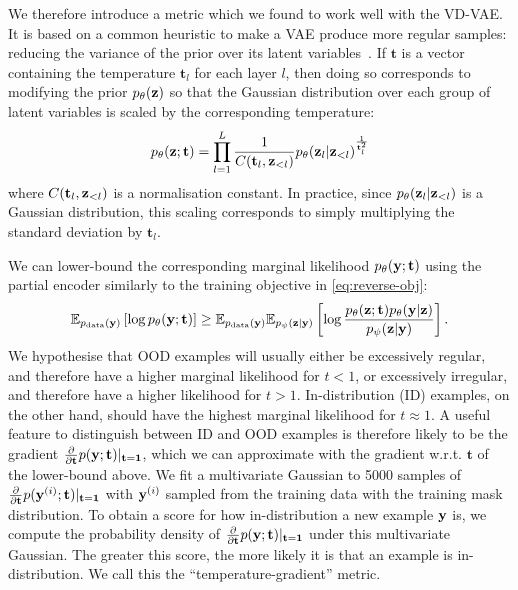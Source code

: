 We therefore introduce a metric which we found to work well with the VD-VAE. It
is based on a common heuristic to make a VAE produce more regular samples:
reducing the variance of the prior over its latent
variables~\citep{vahdat2020nvae}. If $\mathbf{t}$ is a vector containing the
temperature $\mathbf{t}_l$ for each layer $l$, then doing so corresponds to
modifying the prior $p_\theta({\mathbf{z}})$ so that the Gaussian distribution over each
group of latent variables is scaled by the corresponding temperature:
\begin{equation}
  p_\theta({\mathbf{z}}; \mathbf{t}) = \prod_{l=1}^L  \frac{1}{C(\mathbf{t}_l, {\mathbf{z}}_{<l})} p_\theta({\mathbf{z}}_l|{\mathbf{z}}_{<l})^{\frac{1}{\mathbf{t}^2_l}}
\end{equation}
where $C(\mathbf{t}_l, {\mathbf{z}}_{<l})$ is a normalisation constant. In practice, since
$p_\theta({\mathbf{z}}_l|{\mathbf{z}}_{<l})$ is a Gaussian distribution, this scaling corresponds to
simply multiplying the standard deviation by $\mathbf{t}_l$.

We can lower-bound the corresponding marginal likelihood $p_\theta({\mathbf{y}};
\mathbf{t})$ using the partial encoder similarly to the training objective in
\cref{eq:reverse-obj}:
\begin{align}
  \mathbb{E}_{p_{\rm{data}} ({\mathbf{y}})} \left[ \log p_\theta({\mathbf{y}}; \mathbf{t}) \right] \geq \mathbb{E}_{p_{\rm{data}} ({\mathbf{y}})}\mathbb{E}_{p_\psi({\mathbf{z}}|{\mathbf{y}})} \left[ \log\frac{p_\theta({\mathbf{z}}; \mathbf{t})p_\theta({\mathbf{y}}|{\mathbf{z}})}{p_\psi({\mathbf{z}}|{\mathbf{y}})} \right] .
\end{align}
We hypothesise that OOD examples will usually either be excessively regular, and
therefore have a higher marginal likelihood for $t<1$, or excessively irregular,
and therefore have a higher likelihood for $t>1$. In-distribution (ID) examples,
on the other hand, should have the highest marginal likelihood for $t\approx 1$.
A useful feature to distinguish between ID and OOD examples is therefore likely
to be the gradient $\frac{\partial}{\partial\mathbf{t}}p({\mathbf{y}};
\mathbf{t})\lvert_{\mathbf{t}=\mathbf{1}}$, which we can approximate with the
gradient w.r.t. $\mathbf{t}$ of the lower-bound above. We fit a multivariate
Gaussian to 5000 samples of
$\frac{\partial}{\partial\mathbf{t}}p({\mathbf{y}}^{(i)};
\mathbf{t})\lvert_{\mathbf{t}=\mathbf{1}}$ with ${\mathbf{y}}^{(i)}$ sampled from
the training data with the training mask distribution. To obtain a score for how
in-distribution a new example ${\mathbf{y}}$ is, we compute the probability density
of $\frac{\partial}{\partial\mathbf{t}}p({\mathbf{y}};
\mathbf{t})\lvert_{\mathbf{t}=\mathbf{1}}$ under this multivariate Gaussian. The
greater this score, the more likely it is that an example is in-distribution. We
call this the ``temperature-gradient'' metric.

